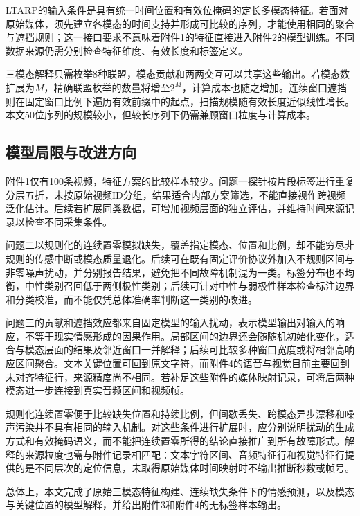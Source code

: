 LTARP的输入条件是具有统一时间位置和有效位掩码的定长多模态特征。若面对原始媒体，须先建立各模态的时间支持并形成可比较的序列，才能使用相同的聚合与遮挡规则；这一接口要求不意味着附件1的特征直接进入附件2的模型训练。不同数据来源仍需分别检查特征维度、有效长度和标签定义。

三模态解释只需枚举8种联盟，模态贡献和两两交互可以共享这些输出。若模态数扩展为$M$，精确联盟枚举的数量将增至$2^M$，计算成本也随之增加。连续窗口遮挡则在固定窗口比例下遍历有效前缀中的起点，扫描规模随有效长度近似线性增长。本文50位序列的规模较小，但较长序列下仍需兼顾窗口粒度与计算成本。

\subsection{模型局限与改进方向}\label{subsec:evaluation_limits}

附件1仅有100条视频，特征方案的比较样本较少。问题一探针按片段标签进行重复分层五折，未按原始视频ID分组，结果适合内部方案筛选，不能直接视作跨视频泛化估计。后续若扩展同类数据，可增加视频层面的独立评估，并维持时间来源记录以检查不同采集条件。

问题二以规则化的连续置零模拟缺失，覆盖指定模态、位置和比例，却不能穷尽非规则的传感中断或模态质量退化。后续可在既有固定评价协议外加入不规则区间与非零噪声扰动，并分别报告结果，避免把不同故障机制混为一类。标签分布也不均衡，中性类别召回低于两侧极性类别；后续可针对中性与弱极性样本检查标注边界和分类校准，而不能仅凭总体准确率判断这一类别的改进。

问题三的贡献和遮挡效应都来自固定模型的输入扰动，表示模型输出对输入的响应，不等于现实情感形成的因果作用。局部区间的边界还会随随机初始化变化，适合与模态层面的结果及邻近窗口一并解释；后续可比较多种窗口宽度或将相邻高响应区间聚合。文本关键位置可回到原文字符，而附件4的语音与视觉目前主要回到未对齐特征行，来源精度尚不相同。若补足这些附件的媒体映射记录，可将后两种模态进一步连接到真实音频区间和视频帧。

规则化连续置零便于比较缺失位置和持续比例，但间歇丢失、跨模态异步漂移和噪声污染并不具有相同的输入机制。对这些条件进行扩展时，应分别说明扰动的生成方式和有效掩码语义，而不能把连续置零所得的结论直接推广到所有故障形式。解释的来源粒度也需与附件记录相匹配：文本字符区间、音频特征行和视觉特征行提供的是不同层次的定位信息，未取得原始媒体时间映射时不输出推断秒数或帧号。

总体上，本文完成了原始三模态特征构建、连续缺失条件下的情感预测，以及模态与关键位置的模型解释，并给出附件3和附件4的无标签样本输出。
